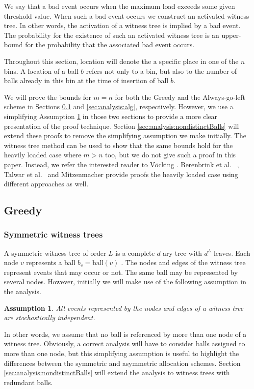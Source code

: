 \documentclass[a4paper,12pt]{article}
\newtheorem{assumption}{Assumption}
\begin{document}
We say that a bad event occurs when the maximum load exceeds some given threshold value. When such a bad event occurs we construct an activated witness tree. In other words, the activation of a witness tree is implied by a bad event. The probability for the existence of such an activated witness tree is an upper-bound for the probability that the associated bad event occurs.

Throughout this section, location will denote the a specific place in one of the $n$ bins. A location of a ball $b$ refers not only to a bin, but also to the number of balls already in this bin at the time of insertion of ball $b$.

We will prove the bounds for $m=n$ for both the Greedy and the Always-go-left scheme in Sections \ref{sec:analysis:greedy} and \ref{sec:analysis:alg}, respectively. However, we use a simplifying Assumption \ref{assumption:independence} in those two sections to provide a more clear presentation of the proof technique. Section \ref{sec:analysis:nondistinctBalls} will extend these proofs to remove the simplifying assumption we make initially. The witness tree method can be used to show that the same bounds hold for the heavily loaded case where $m> n$ too, but we do not give such a proof in this paper. Instead, we refer the interested reader to V\"ocking \cite{VOC03}. Berenbrink et al.  ~\cite{BCSV06}, Talwar et al.~\cite{TW13} and Mitzenmacher \cite{MRS01} provide proofs the heavily loaded case using different approaches as well.

\subsection{Greedy}
\label{sec:analysis:greedy}

\subsubsection{Symmetric witness trees}
\label{sec:analysis:definitionSymWT}
A symmetric witness tree of order $L$ is a complete $d$-ary tree with $d^{L}$ leaves. Each node $v$ represents a ball $b_v = \mathrm{ball}(v)$ . The nodes and edges of the witness tree represent events that may occur or not. The same ball may be represented by several nodes. However, initially we will make use of the following assumption in the analysis.
\begin{assumption}
\label{assumption:independence}
All events represented by the nodes and edges of a witness tree are stochastically independent. 
\end{assumption}
In other words, we assume that no ball is referenced by more than one node of a witness tree. Obviously, a correct analysis will have to consider balls assigned to more than one node, but this simplifying assumption is useful to highlight the differences between the symmetric and asymmetric allocation schemes. Section \ref{sec:analysis:nondistinctBalls} will extend the analysis to witness trees with redundant balls.
\end{document}
